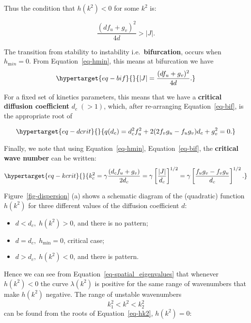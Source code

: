 \documentclass[
  letterpaper,
  DIV=11,
  numbers=noendperiod]{scrreprt}
\providecommand{\tightlist}{%
  \setlength{\itemsep}{0pt}\setlength{\parskip}{0pt}}\usepackage{longtable,booktabs,array}
\theoremstyle{plain}
\theoremstyle{definition}
\theoremstyle{plain}
\theoremstyle{remark}
\begin{document}
Thus the condition that \(h(k^2) < 0\) for some \(k^2\) is:

\[
\frac{(df_u + g_v)^2}{4d} > |J|.
\]

The transition from stability to instability i.e.~\textbf{bifurcation},
occurs when \(h_{{\mathrm min}} = 0\). From Equation~\ref{eq-hmin}, this
means at bifurcation we have
\begin{equation}\protect\hypertarget{eq-bif}{}{
|J| = \frac{(df_u + g_v)^2}{4d}.
}\label{eq-bif}\end{equation}

For a fixed set of kinetics parameters, this means that we have a
\textbf{critical diffusion coefficient} \(d_c \;(>1)\), which, after
re-arranging Equation~\ref{eq-bif}, is the appropriate root of

\begin{equation}\protect\hypertarget{eq-dcrit}{}{
q(d_c) = d^2_c f_u^2 + 2( 2 f_v g_u - f_u g_v) d_c + g_v^2 =0.
}\label{eq-dcrit}\end{equation}

Finally, we note that using Equation~\ref{eq-hmin},
Equation~\ref{eq-bif}, the \textbf{critical wave number} can be written:
\begin{equation}\protect\hypertarget{eq-kcrit}{}{
k_c^2 =\gamma  \frac{( d_c f_u + g_v)} { 2 d_c} = \gamma \left[ \frac {|J|}{d_c} \right]^{1/2} = \gamma \left[ \frac{f_u g_v - f_v g_u}{d_c} \right]^{1/2}. 
}\label{eq-kcrit}\end{equation}

Figure~\ref{fig-dispersion} (a) shows a schematic diagram of the
(quadratic) function \(h(k^2)\) for three different values of the
diffusion coefficient \(d\):

\begin{itemize}
\tightlist
\item
  \(d < d_c, \; h(k^2) > 0\), and there is no pattern;
\item
  \(d = d_c, \; h_{{\mathrm{min}}} = 0\), critical case;
\item
  \(d > d_c, \; h(k^2) < 0\), and there is pattern.
\end{itemize}

Hence we can see from Equation~\ref{eq-spatial_eigenvalues} that
whenever \(h(k^2) < 0\) the curve \(\lambda(k^2)\) is positive for the
same range of wavenumbers that make \(h(k^2)\) negative. The range of
unstable wavenumbers \[
k^2_1 < k^2 < k^2_2
\] can be found from the roots of Equation~\ref{eq-hk2}, \(h(k^2) = 0\):
\end{document}
